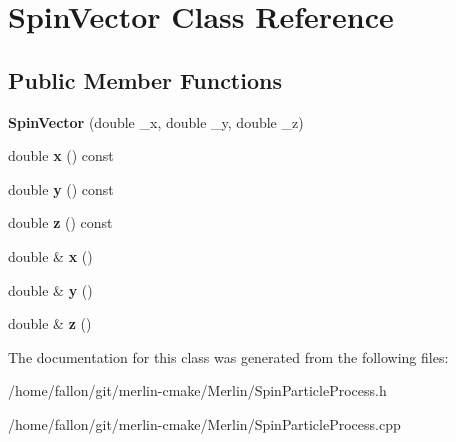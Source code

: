 \hypertarget{classSpinVector}{}\section{Spin\+Vector Class Reference}
\label{classSpinVector}
\subsection*{Public Member Functions}
\begin{DoxyCompactItemize}
\item 
\mbox{\label{classSpinVector_a18647f99a1fc4cd3059cd2f7b6ed8785}} 
{\bfseries Spin\+Vector} (double \+\_\+x, double \+\_\+y, double \+\_\+z)
\item 
\mbox{\label{classSpinVector_a8342ecf6e94f303c0b57174ed1c07883}} 
double {\bfseries x} () const
\item 
\mbox{\label{classSpinVector_a6e2076f75c24f9a171c60086bd9fb735}} 
double {\bfseries y} () const
\item 
\mbox{\label{classSpinVector_a39a23656888846d7b2ef12ad4f6503d2}} 
double {\bfseries z} () const
\item 
\mbox{\label{classSpinVector_a2a5b51e39ef90b376f09d3f22298166e}} 
double \& {\bfseries x} ()
\item 
\mbox{\label{classSpinVector_a1cb0285192a6330dc327625d489c9562}} 
double \& {\bfseries y} ()
\item 
\mbox{\label{classSpinVector_ac8a34499ada867e859ee024dc94a4256}} 
double \& {\bfseries z} ()
\end{DoxyCompactItemize}


The documentation for this class was generated from the following files\+:\begin{DoxyCompactItemize}
\item 
/home/fallon/git/merlin-\/cmake/\+Merlin/Spin\+Particle\+Process.\+h\item 
/home/fallon/git/merlin-\/cmake/\+Merlin/Spin\+Particle\+Process.\+cpp\end{DoxyCompactItemize}
